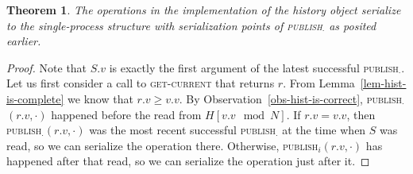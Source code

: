 \documentclass[a4paper,11pt]{article}
\newtheorem{theorem}{Theorem}
\newcommand{\fn}[1]{\textsc{#1}}
\begin{document}
\begin{theorem}
The operations in the implementation of the history object serialize to the single-process structure with serialization points of \fn{publish$_\cdot$} as posited earlier.
\end{theorem}
\begin{proof}
Note that $S.v$ is exactly the first argument of the latest successful \fn{publish$_\cdot$}. Let us first consider a call to \fn{get-current} that returns $r$. From Lemma~\ref{lem-hist-is-complete} we know that 
$r.v \geq v.v$.
By Observation~\ref{obs-hist-is-correct}, \fn{publish$_\cdot$}$(r.v, \cdot)$ happened before the read from $H[v.v\mod N]$. If $r.v = v.v$, then \fn{publish$_\cdot$}$(r.v, \cdot)$ was the most recent successful \fn{publish$_\cdot$} at the time when $S$ was read, so we can serialize the operation there. Otherwise, \fn{publish$_i$}$(r.v, \cdot)$ has happened after that read, so we can serialize the operation just after it.


\end{proof}
\end{document}
